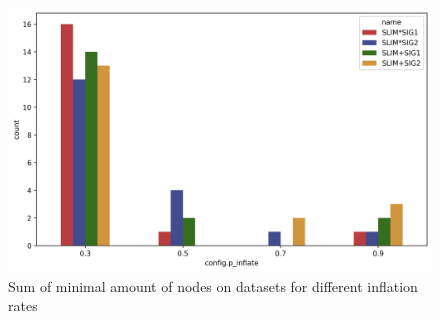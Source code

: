 
    \begin{figure}[h]
    \centering
    \includegraphics[width=\linewidth]{figures/countplot_nodes.png}
    \caption{Sum of minimal amount of nodes on datasets for different inflation rates}
    \label{fig:countplot_nodes}
    \end{figure}
    